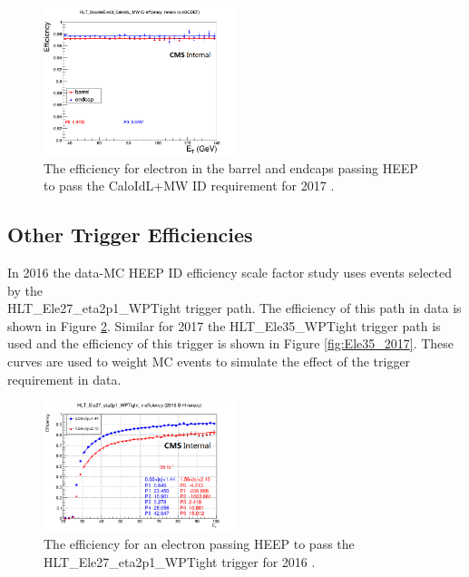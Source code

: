 \begin{figure}[h!]
\begin{center}
\includegraphics[width=0.5\textwidth]{figures/Zprime/2017/trigger/eff_DouEle33_ID.png}
\caption{The efficiency for electron in the barrel and endcaps passing HEEP to pass the CaloIdL+MW ID requirement for 2017 \cite{CMS-AN-2018-021}.}
\label{fig:HLT_ID_2017}
\end{center}
\end{figure}

\subsection{Other Trigger Efficiencies}\label{sec:Other_HLT_efficiency}
In 2016 the data-MC HEEP ID efficiency scale factor study uses events selected by the \\
HLT\_Ele27\_eta2p1\_WPTight trigger path. The efficiency of this path in data is shown in Figure \ref{fig:Ele27_2016}. Similar for 2017 the HLT\_Ele35\_WPTight trigger path is used and the efficiency of this trigger is shown in Figure \ref{fig:Ele35_2017}. These curves are used to weight MC events to simulate the effect of the trigger requirement in data.

\begin{figure}[h!]
\begin{center}
\includegraphics[width=0.5\textwidth]{figures/Zprime/2016/trigger/ele27Eff.png}
\caption{The efficiency for an electron passing HEEP to pass the HLT\_Ele27\_eta2p1\_WPTight trigger for 2016 \cite{CMS-AN-2016-404}.}
\label{fig:Ele27_2016}
\end{center}
\end{figure}

